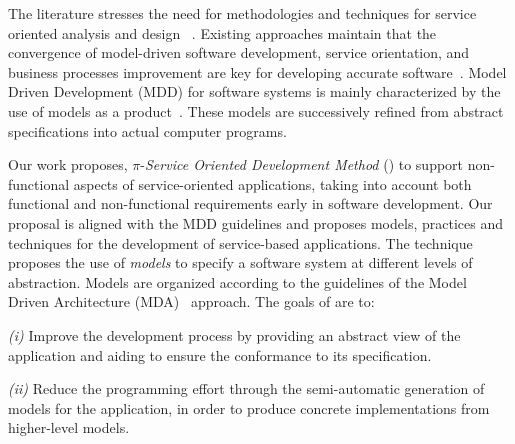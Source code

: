 




The literature stresses the need for meth\-od\-ol\-o\-gies and techniques for service oriented analysis and design 
~\cite{Papazoglou2007}. 
Existing approaches maintain that the convergence of model-driven soft\-ware development, service orientation,   and  busi\-ness processes improvement are key for developing accurate  software~\cite{watson}. 
Model Driven Development (MDD)  for software systems is mainly characterized by the use of models as a product~\cite{Selic03}.
These models are successively refined from abstract specifications into actual computer programs.

Our work proposes, $\pi$-\textit{Service Oriented Development Method} (\pisodm) to support non-functional aspects of service-oriented applications, taking into account both functional and non-functional requirements early in software development.
Our proposal is aligned with the MDD guidelines and proposes models, practices and techniques for the development of service-based applications.  The technique proposes  the use of \textit{models} to specify a software system at different levels of abstraction. 
Models are organized according to the guidelines of the Model Driven Archi\-tec\-ture (MDA)~\cite{miller} approach. 
The goals of  \pisodm are to:
\begin{trivlist}
\item \textit{(i)} Improve the development process by providing an abstract view of the application and aiding to ensure the conformance to its specification.
\item \textit{(ii)} Reduce the programming effort through the semi-automatic generation of  models for the application, in order to produce concrete implementations from higher-level models.
\end{trivlist}

